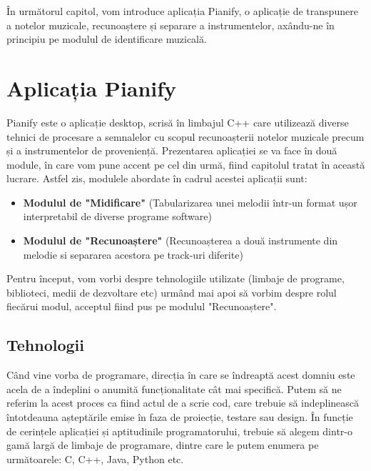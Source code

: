 \documentclass[a4paper,12pt]{report}
\begin{document}
	În următorul capitol, vom introduce aplicația Pianify, o aplicație de transpunere a notelor muzicale, recunoaștere și separare a instrumentelor, axându-ne în principiu pe modulul de identificare muzicală.
    
    \clearpage
    \section{Aplicația Pianify}
  	Pianify este o aplicație desktop, scrisă în limbajul C++ care utilizează diverse tehnici de procesare a semnalelor cu scopul recunoașterii notelor muzicale precum și a instrumentelor de proveniență. Prezentarea aplicației se va face în două module, în care vom pune accent pe cel din urmă, fiind capitolul tratat în această lucrare. Astfel zis, modulele abordate în cadrul acestei aplicații sunt:
  	\begin{itemize}
  		\item \textbf{Modulul de "Midificare"} (Tabularizarea unei melodii într-un format ușor interpretabil de diverse programe software)
  		\item \textbf{Modulul de "Recunoaștere"} (Recunoașterea a două instrumente din melodie si separarea acestora pe track-uri diferite)
  	\end{itemize}
  	Pentru început, vom vorbi despre tehnologiile utilizate (limbaje de programe, biblioteci, medii de dezvoltare etc)  urmând mai apoi să vorbim despre rolul fiecărui modul, acceptul fiind pus pe modulul "Recunoaștere".
  	\subsection{Tehnologii}
  	Când vine vorba de programare, direcția în care se îndreaptă acest domniu este acela de a îndeplini o anumită funcționalitate cât mai specifică. Putem să ne referim la acest proces ca fiind actul de a scrie cod, care trebuie să indeplinească întotdeauna așteptările emise în faza de proiecție, testare sau design. În funcție de cerințele aplicației și aptitudinile programatorului, trebuie să alegem dintr-o gamă largă de limbaje de programare, dintre care le putem enumera pe următoarele: C, C++, Java, Python etc.
  	
\end{document}
